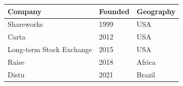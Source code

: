 \begin{tabular}{|l|l|p{6cm}|}
\hline
\textbf{Company}                                 & \textbf{Founded} & \textbf{Geography} \\ \hline
Shareworks\cite{Sharewor68:online}               & 1999             & USA                \\ \hline
Carta\cite{CartaEqu70:online}                    & 2012             & USA                \\ \hline
Long-term Stock Exchange\cite{LTSEHome63:online} & 2015             & USA                \\ \hline
Raise\cite{Software0:online}                     & 2018             & Africa             \\ \hline
Distu\cite{DistuEqu4:online}                     & 2021             & Brazil             \\ \hline
\end{tabular}

